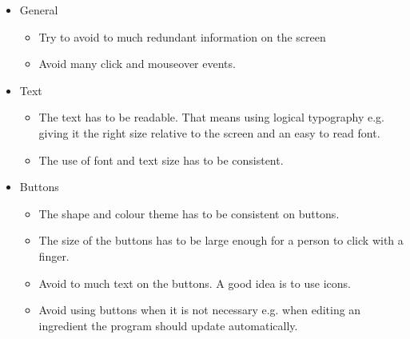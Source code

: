 \begin{itemize}
	\item General
		\begin{itemize}
			\item Try to avoid to much redundant information on the screen
			\item Avoid many click and mouseover events.
		\end{itemize}
	\item Text
		\begin{itemize}
			\item The text has to be readable. That means using logical typography e.g. giving it the right size relative to the screen and an easy to read font.	
			\item The use of font and text size has to be consistent.
		\end{itemize}
	\item Buttons
		\begin{itemize}
			\item The shape and colour theme has to be consistent on buttons.
			\item The size of the buttons has to be large enough for a person to click with a finger.
			\item Avoid to much text on the buttons. A good idea is to use icons.
			\item Avoid using buttons when it is not necessary e.g. when editing an ingredient the program should update automatically.
		\end{itemize}
\end{itemize}    

